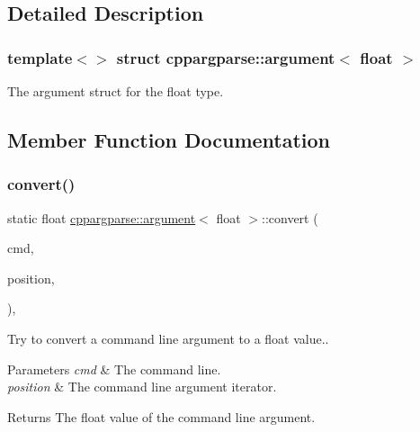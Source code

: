 \subsection{Detailed Description}
\subsubsection*{template$<$$>$\newline
struct cppargparse\+::argument$<$ float $>$}

The argument struct for the float type. 

\subsection{Member Function Documentation}
\mbox{\label{structcppargparse_1_1argument_3_01float_01_4_a1597e4ca43d6ea6fe91a99a796d5e5a7}} 
\subsubsection{\texorpdfstring{convert()}{convert()}}
{\footnotesize\ttfamily static float \hyperlink{structcppargparse_1_1argument}{cppargparse\+::argument}$<$ float $>$\+::convert (\begin{DoxyParamCaption}\item[{const \hyperlink{types_8h_a80adf2418b7ce9fe616698efa7533ecf}{types\+::\+Command\+Line\+\_\+t} \&}]{cmd,  }\item[{const \hyperlink{types_8h_a43b4f43f8940de1bf09ced6f1b668053}{types\+::\+Command\+Line\+Position\+\_\+t} \&}]{position,  }\item[{const \hyperlink{types_8h_a003c660afe2ee9c6cc39aea966e8926d}{types\+::\+Command\+Line\+Arguments\+\_\+t} \&}]{ }\end{DoxyParamCaption})\hspace{0.3cm}{\ttfamily [inline]}, {\ttfamily [static]}}



Try to convert a command line argument to a float value.. 


\begin{DoxyParams}{Parameters}
{\em cmd} & The command line. \\
\hline
{\em position} & The command line argument iterator.\\
\hline
\end{DoxyParams}
\begin{DoxyReturn}{Returns}
The float value of the command line argument. 
\end{DoxyReturn}
\mbox{\label{structcppargparse_1_1argument_3_01float_01_4_a5185bf8e191d78341b17be5a4ca6c2f4}} 
